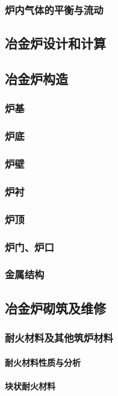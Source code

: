 \documentclass[UTF8]{../../ApplicationUniverse}
\begin{document}
        \subsubsection{炉内气体的平衡与流动}
    \subsection{冶金炉设计和计算}
    \subsection{冶金炉构造}
        \subsubsection{炉基}
        \subsubsection{炉底}
        \subsubsection{炉壁}
        \subsubsection{炉衬}
        \subsubsection{炉顶}
        \subsubsection{炉门、炉口}
        \subsubsection{金属结构}
    \subsection{冶金炉砌筑及维修}
        \subsubsection{耐火材料及其他筑炉材料}
            \paragraph{耐火材料性质与分析}
            \paragraph{块状耐火材料}
\end{document}
